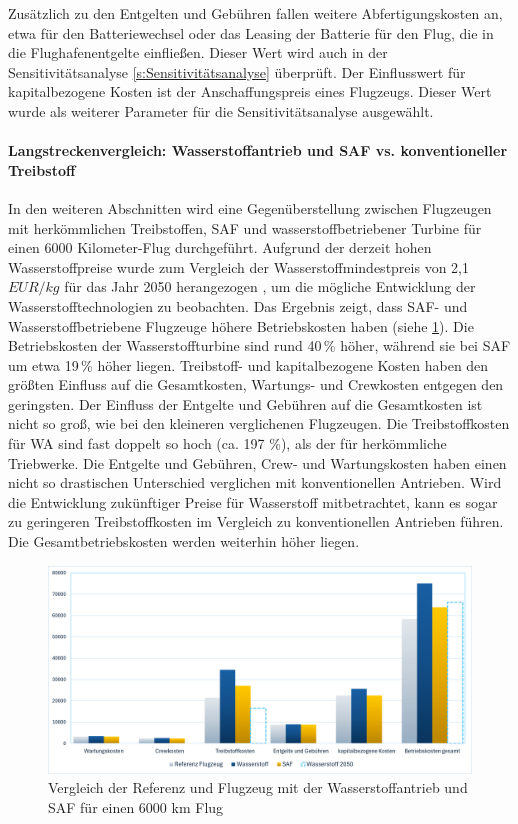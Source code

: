 Zusätzlich zu den Entgelten und Gebühren fallen weitere Abfertigungskosten an,
etwa für den Batteriewechsel oder das Leasing der Batterie für den Flug,
die in die Flughafenentgelte einfließen.
Dieser Wert wird auch in der Sensitivitätsanalyse \ref{s:Sensitivitätsanalyse} überprüft. 
Der Einflusswert für kapitalbezogene Kosten ist der Anschaffungspreis eines Flugzeugs. 
Dieser Wert wurde als weiterer Parameter für die Sensitivitätsanalyse ausgewählt.\\

\paragraph{Langstreckenvergleich: Wasserstoffantrieb und SAF vs. konventioneller Treibstoff}
In den weiteren Abschnitten wird eine Gegenüberstellung zwischen Flugzeugen mit herkömmlichen Treibstoffen, 
SAF und wasserstoffbetriebener Turbine für einen 6000 Kilometer-Flug durchgeführt. %
Aufgrund der derzeit hohen Wasserstoffpreise wurde zum Vergleich der Wasserstoffmindestpreis 
von 2,1 $EUR/kg$ für das Jahr 2050 herangezogen \cite{hoelzen2022hydrogen}, 
um die mögliche Entwicklung der Wasserstofftechnologien zu beobachten.
%
Das Ergebnis zeigt, dass SAF- und Wasserstoffbetriebene Flugzeuge höhere Betriebskosten haben (siehe \ref{vergleichWA_Ref}).
Die Betriebskosten der Wasserstoffturbine sind rund 40 \% höher, während sie bei SAF um etwa 19 \% höher liegen.
Treibstoff- und kapitalbezogene Kosten haben den größten Einfluss auf die Gesamtkosten, 
Wartungs- und Crewkosten entgegen den geringsten.
Der Einfluss der Entgelte und Gebühren auf die Gesamtkosten ist nicht so groß, 
wie bei den kleineren verglichenen Flugzeugen.
Die Treibstoffkosten für WA sind fast doppelt so hoch (ca. 197 \%), als der für herkömmliche Triebwerke. 
Die Entgelte und Gebühren, Crew- und Wartungskosten haben einen nicht so 
drastischen Unterschied verglichen mit konventionellen Antrieben. 
%
Wird die Entwicklung zukünftiger Preise für Wasserstoff mitbetrachtet, 
kann es sogar zu geringeren Treibstoffkosten im Vergleich zu konventionellen Antrieben führen. 
Die Gesamtbetriebskosten werden weiterhin höher liegen.

\begin{figure}[h]
	\centering
	\includegraphics[width=0.9\linewidth]{Bilder/VergleichWA_SAF.png}
	\caption[Betriebskosten]{Vergleich der Referenz und Flugzeug mit der Wasserstoffantrieb und SAF für einen 6000 km Flug}
	\label{vergleichWA_Ref}
\end{figure}

